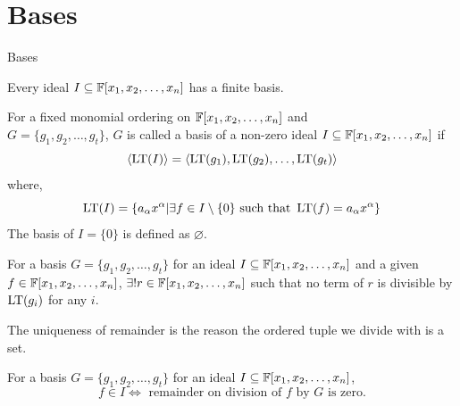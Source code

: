 \documentclass[aspectratio=169, handout, 10pt, hyperref=colorlinks]{beamer}
\begin{document}
\section{\Grob Bases}
\begin{frame}[allowframebreaks]{\Grob Bases}
    \begin{theorem}{\label{eq:hilbertbasistheorem}}
    Every ideal $I\subseteq \mathbb{F}[x_1, x_2, \ldots, x_n]$ has a finite basis.
\end{theorem}
\begin{defn}
    For a fixed monomial ordering on $\mathbb{F}[x_1, x_2, \ldots, x_n]$ and \\$G = \{g_1, g_2, \ldots, g_t\}$, $G$ is called a \Grob basis of a non-zero ideal $ I  \subseteq\mathbb{F}[x_1, x_2, \ldots, x_n]$ if
    \begin{equation}
        \langle \operatorname{LT}(I)\rangle = \langle \operatorname{LT}(g_1), \operatorname{LT}(g_2), \ldots, \operatorname{LT}(g_t)\rangle
    \end{equation}
    where,
        \begin{equation}
        \operatorname{LT}(I)=\{a_\alpha x^\alpha|\exists f\in I\setminus\{0\} \text{ such that } \operatorname{LT}(f)=a_\alpha x^\alpha\}
    \end{equation}
    The \Grob basis of $I=\{0\}$ is defined as $\varnothing$.
\end{defn}
\begin{prop}
    For a \Grob basis $G = \{g_1, g_2, \ldots, g_t\}$ for an ideal $I\subseteq\mathbb{F}[x_1, x_2, \ldots, x_n]$ and a given $f\in\mathbb{F}[x_1, x_2, \ldots, x_n]$, $\exists!r\in\mathbb{F}[x_1, x_2, \ldots, x_n]$ such that no term of $r$ is divisible by $\operatorname{LT}(g_i)$ for any $i$.

    The uniqueness of remainder is the reason the ordered tuple we divide with is a set.
\end{prop}

\begin{theorem}
    For a \Grob basis $G = \{g_1, g_2, \ldots, g_t\}$ for an ideal $I\subseteq\mathbb{F}[x_1, x_2, \ldots, x_n]$,
    \begin{equation}
         f\in I\Leftrightarrow \text{ remainder on division of } f \text{ by } G \text{ is zero}.
    \end{equation}
\end{theorem}
\end{frame}
\end{document}
